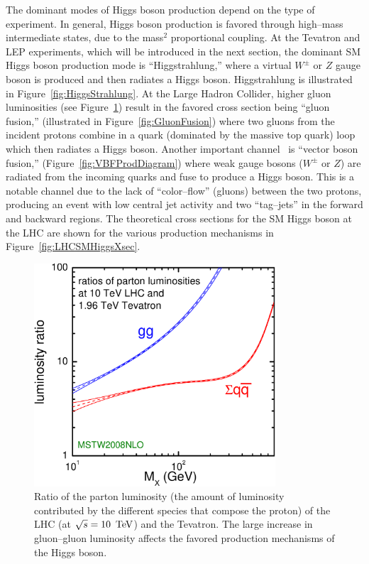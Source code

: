 The dominant modes of Higgs boson production depend on the type of experiment.
In general, Higgs boson production is favored through high--mass intermediate states,
due to the mass$^2$ proportional coupling.  At the Tevatron and LEP experiments,
which will be introduced in the next section, the dominant SM Higgs boson production
mode is ``Higgstrahlung,'' where a virtual $W^\pm$ or $Z$ gauge boson is
produced and then radiates a Higgs boson.  Higgstrahlung is illustrated in
Figure~\ref{fig:HiggsStrahlung}.  At the Large Hadron Collider, higher gluon
luminosities (see Figure~\ref{fig:GluonLumiRatio}) result in the favored cross
section being ``gluon fusion,'' (illustrated in Figure~\ref{fig:GluonFusion})
where two gluons from the incident protons combine in a quark (dominated by the
massive top quark) loop which then radiates a Higgs boson.  Another important
channel~\cite{Rainwater:1998kj} is ``vector boson fusion,''
(Figure~\ref{fig:VBFProdDiagram}) where weak gauge bosons ($W^\pm$ or $Z$) are
radiated from the incoming quarks and fuse to produce a Higgs boson.  This is a
notable channel due to the lack of ``color--flow'' (gluons) between the two
protons, producing an event with low central jet activity and two ``tag--jets''
in the forward and backward regions.  The theoretical cross sections for the SM
Higgs boson at the LHC are shown for the various production mechanisms in
Figure~\ref{fig:LHCSMHiggsXsec}.
\begin{figure}
  \centering
  \includegraphics[width=90mm,angle=0]{theory_chapter/figures/parton_lumis_10TeV_vs_2TeV.pdf}
  \caption[Parton luminosity comparison of the LHC and Tevatron]{Ratio of the
  parton luminosity (the amount of luminosity contributed by the different
  species that compose the proton) of the LHC (at \mbox{$\sqrt s = 10~\,\text{Te\hspace{-.08em}V}$}) and the
  Tevatron.  The large increase in gluon--gluon luminosity affects the favored
  production mechanisms of the Higgs boson.  } \label{fig:GluonLumiRatio}
\end{figure}
